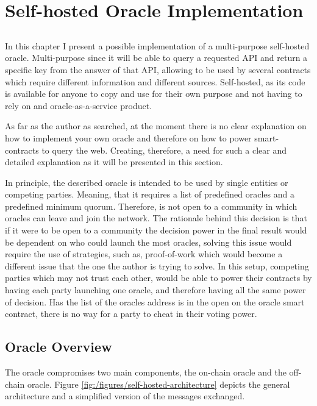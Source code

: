 \chapter{Self-hosted Oracle Implementation} \label{chap:concl}

\section*{}

In this chapter I present a possible implementation of a multi-purpose self-hosted oracle. Multi-purpose since it will be able to query a requested API and return a specific key from the answer of that API, allowing to be used by several contracts which require different information and different sources. Self-hosted, as its code is available for anyone to copy and use for their own purpose and not having to rely on and oracle-as-a-service product.

As far as the author as searched, at the moment there is no clear explanation on how to implement your own oracle and therefore on how to power smart-contracts to query the web. Creating, therefore, a need for such a clear and detailed explanation as it will be presented in this section.

In principle, the described oracle is intended to be used by single entities or competing parties. Meaning, that it requires a list of predefined oracles and a predefined minimum quorum. Therefore, is not open to a community in which oracles can leave and join the network. The rationale behind this decision is that if it were to be open to a community the decision power in the final result would be dependent on who could launch the most oracles, solving this issue would require  the use of strategies, such as, proof-of-work which would become a different issue that the one the author is trying to solve.
In this setup, competing parties which may not trust each other, would be able to power their contracts by having each party launching one oracle, and therefore having all the same power of decision. Has the list of the oracles address is in the open on the oracle smart contract, there is no way for a party to cheat in their voting power.

\section{Oracle Overview}

The oracle compromises two main components, the on-chain oracle and the off-chain oracle. Figure \ref{fig:/figures/self-hosted-architecture} depicts the general architecture and a simplified version of the messages exchanged.

